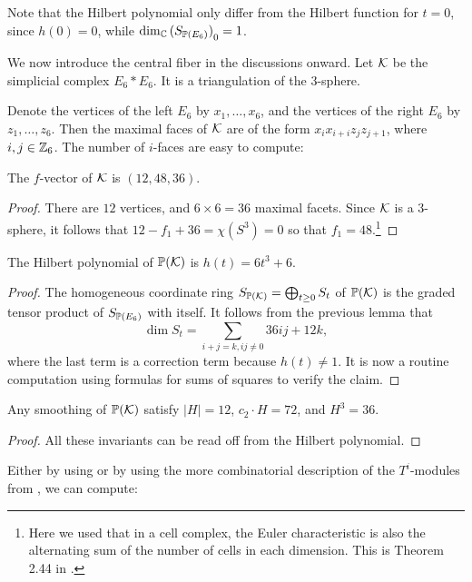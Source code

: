 Note that the Hilbert polynomial only differ from the Hilbert function for $t=0$, since $h(0)=0$, while $\dim_\C {(S_{\P(E_6)})}_0=1$. 

We now introduce the central fiber in the discussions onward. Let $\K$ be the simplicial complex $E_6 \ast E_6$. It is a triangulation of the $3$-sphere.

Denote the  vertices of the left $E_6$ by $x_1,\ldots,x_6$, and the vertices of the right $E_6$ by $z_1,\ldots,z_6$. Then the maximal faces of $\K$ are of the form $x_ix_{i+i}z_jz_{j+1}$, where $i,j \in \Z_6$. The number of $i$-faces are easy to compute:

\begin{lemma}
The $f$-vector of $\K$ is $(12,48,36)$. 
\end{lemma}
\begin{proof}
There are $12$ vertices, and $6 \times 6=36$ maximal facets. Since $\K$ is a 3-sphere, it follows that $12-f_1+36=\chi(S^3)=0$ so that $f_1=48$.\footnote{Here we used that in a cell complex, the Euler characteristic is also the alternating sum of the number of cells in each dimension. This is Theorem 2.44 in \cite{hatcher_topology}.}
\end{proof}

\begin{lemma}
The Hilbert polynomial of $\P(\K)$ is $h(t)=6t^3+6$.
\end{lemma}
\begin{proof}
The homogeneous coordinate ring $S_{\P(\K)}= \bigoplus_{t \geq 0} S_t$ of $\P(\K)$ is the graded tensor product of $S_{\P(E_6)}$ with itself. It follows from the previous lemma that
\[
\dim S_t = \sum_{i+j=k, ij \neq 0} 36ij + 12k,
\]
where the last term is a correction term because $h(t) \neq 1$. It is now a routine computation using formulas for sums of squares to verify the claim.
\end{proof}

\begin{corollary}
Any smoothing of $\P(\K)$ satisfy $|H|=12$, $c_2 \cdot H = 72$, and $H^3=36$.
\end{corollary}
\begin{proof}
All these invariants can be read off from the Hilbert polynomial.
\end{proof}

Either by using \MM or by using the more combinatorial description of the $T^i$-modules from \cite{deforming_christophersen}, we can compute: 

